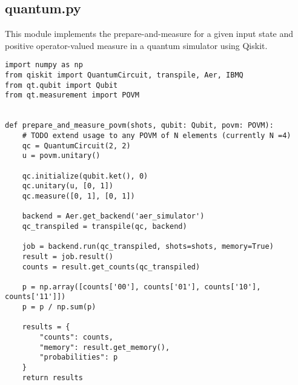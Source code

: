 \subsection{quantum.py}\label{section:listings_quantum}
This module implements the prepare-and-measure for a given input state and positive operator-valued measure in a quantum simulator using Qiskit. 
\begin{verbatim}
import numpy as np
from qiskit import QuantumCircuit, transpile, Aer, IBMQ
from qt.qubit import Qubit
from qt.measurement import POVM


def prepare_and_measure_povm(shots, qubit: Qubit, povm: POVM):
    # TODO extend usage to any POVM of N elements (currently N =4)
    qc = QuantumCircuit(2, 2)
    u = povm.unitary()

    qc.initialize(qubit.ket(), 0)
    qc.unitary(u, [0, 1])
    qc.measure([0, 1], [0, 1])

    backend = Aer.get_backend('aer_simulator')
    qc_transpiled = transpile(qc, backend)

    job = backend.run(qc_transpiled, shots=shots, memory=True)
    result = job.result()
    counts = result.get_counts(qc_transpiled)

    p = np.array([counts['00'], counts['01'], counts['10'], counts['11']])
    p = p / np.sum(p)

    results = {
        "counts": counts,
        "memory": result.get_memory(),
        "probabilities": p
    }
    return results
\end{verbatim}